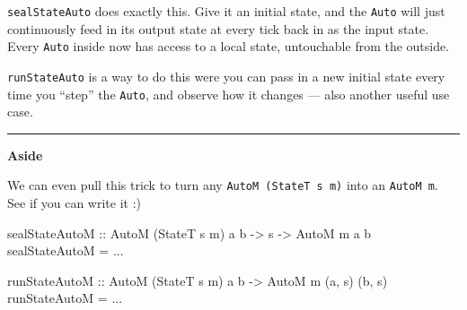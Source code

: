 \documentclass[]{article}
\newenvironment{Shaded}{}{}
\newcommand{\KeywordTok}[1]{\textcolor[rgb]{0.00,0.44,0.13}{\textbf{{#1}}}}
\newcommand{\DataTypeTok}[1]{\textcolor[rgb]{0.56,0.13,0.00}{{#1}}}
\newcommand{\CommentTok}[1]{\textcolor[rgb]{0.38,0.63,0.69}{\textit{{#1}}}}
\newcommand{\OtherTok}[1]{\textcolor[rgb]{0.00,0.44,0.13}{{#1}}}
\newcommand{\FunctionTok}[1]{\textcolor[rgb]{0.02,0.16,0.49}{{#1}}}
\newcommand{\NormalTok}[1]{{#1}}
\begin{document}
\begin{Shaded}
\end{Shaded}

\texttt{sealStateAuto} does exactly this. Give it an initial state, and
the \texttt{Auto} will just continuously feed in its output state at
every tick back in as the input state. Every \texttt{Auto} inside now
has access to a local state, untouchable from the outside.

\texttt{runStateAuto} is a way to do this were you can pass in a new
initial state every time you ``step'' the \texttt{Auto}, and observe how
it changes --- also another useful use case.

\begin{center}\rule{0.5\linewidth}{\linethickness}\end{center}

\textbf{Aside}

We can even pull this trick to turn any \texttt{AutoM\ (StateT\ s\ m)}
into an \texttt{AutoM\ m}. See if you can write it :)

\begin{Shaded}
\begin{Highlighting}[]
\OtherTok{sealStateAutoM ::} \DataTypeTok{AutoM} \NormalTok{(}\DataTypeTok{StateT} \NormalTok{s m) a b }\OtherTok{->} \NormalTok{s }\OtherTok{->} \DataTypeTok{AutoM} \NormalTok{m a b}
\NormalTok{sealStateAutoM }\FunctionTok{=} \FunctionTok{...}

\OtherTok{runStateAutoM ::} \DataTypeTok{AutoM} \NormalTok{(}\DataTypeTok{StateT} \NormalTok{s m) a b }\OtherTok{->} \DataTypeTok{AutoM} \NormalTok{m (a, s) (b, s)}
\NormalTok{runStateAutoM }\FunctionTok{=} \FunctionTok{...}
\end{Highlighting}
\end{Shaded}
\end{document}
